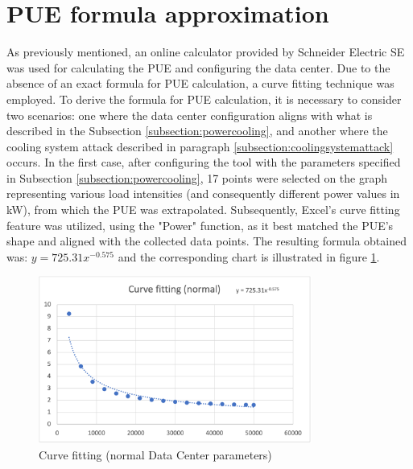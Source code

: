 \section{PUE formula approximation}
As previously mentioned, an online calculator provided by Schneider Electric SE was used for calculating the PUE and configuring the data center. Due to the absence of an exact formula for PUE calculation, a curve fitting technique was employed. To derive the formula for PUE calculation, it is necessary to consider two scenarios: one where the data center configuration aligns with what is described in the Subsection \ref{subsection:powercooling}, and another where the cooling system attack described in paragraph \ref{subsection:coolingsystemattack} occurs. In the first case, after configuring the tool with the parameters specified in Subsection \ref{subsection:powercooling}, 17 points were selected on the graph representing various load intensities (and consequently different power values in kW), from which the PUE was extrapolated. Subsequently, Excel's curve fitting feature was utilized, using the "Power" function, as it best matched the PUE's shape and aligned with the collected data points. The resulting formula obtained was: \(y = 725.31x^{-0.575}\) and the corresponding chart is illustrated in figure \ref{fig:curve_fitting_normal}. 
\begin{figure}[h]
    \centering
    \includegraphics[width=0.8\textwidth]{chapters/images/curve_fitting_normal.png}
    \caption{Curve fitting (normal Data Center parameters)}
    \label{fig:curve_fitting_normal}
\end{figure}



